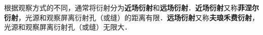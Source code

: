 根据观察方式的不同，通常将衍射分为\textbf{近场衍射}和\textbf{远场衍射}．\textbf{近场衍射}又称\textbf{菲涅尔衍射}，光源和观察屏离衍射孔（或缝）的距离有限．\textbf{远场衍射}又称\textbf{夫琅禾费衍射}，光源和观察屏离衍射孔（或缝）无限大．


